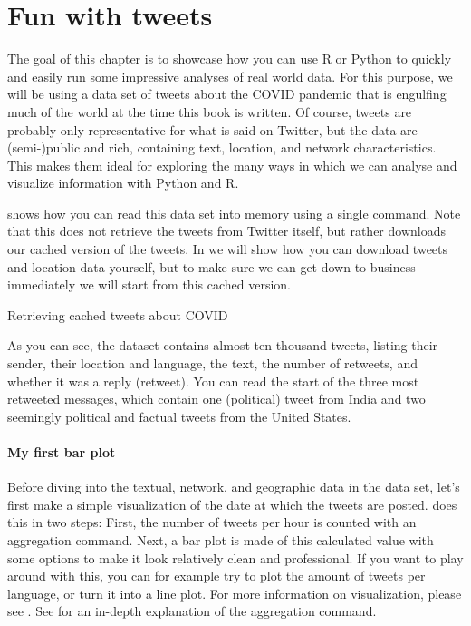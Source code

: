 \section{Fun with tweets}

The goal of this chapter is to showcase how you can use R or Python to quickly and easily
run some impressive analyses of real world data.
For this purpose, we will be using a data set of tweets about the COVID pandemic that is
engulfing much of the world at the time this book is written.
Of course, tweets are probably only representative for what is said on Twitter,
but the data are (semi-)public and rich, containing text, location, and network characteristics.
This makes them ideal for exploring the many ways in which we can analyse and visualize information
with Python and R. 

 shows how you can read this data set into memory using a single command.
Note that this does not retrieve the tweets from Twitter itself, but rather downloads
our cached version of the tweets.
In  we will show how you can download tweets and location data yourself, but to make sure
we can get down to business immediately we will start from this cached version. 

\begin{ccsexample}
\caption{Retrieving cached tweets about COVID}\label{ex:funtweets}
\end{ccsexample}

As you can see, the dataset contains almost ten thousand tweets, listing their
sender, their location and language, the text, the number of retweets, and whether it was a reply (retweet).
You can read the start of the three most retweeted messages, which contain one (political) tweet from India
and two seemingly political and factual tweets from the United States.

\paragraph{My first bar plot} Before diving into the textual, network, and geographic data in the data set,
let's first make a simple visualization of the date at which the tweets are posted.
 does this in two steps:
First, the number of tweets per hour is counted with an aggregation command.
Next, a bar plot is made of this calculated value with some options to make it look relatively clean and professional.
If you want to play around with this, you can for example try to plot the amount of tweets per language,
or turn it into a line plot. 
For more information on visualization, please see .
See  for an in-depth explanation of the aggregation command. 

